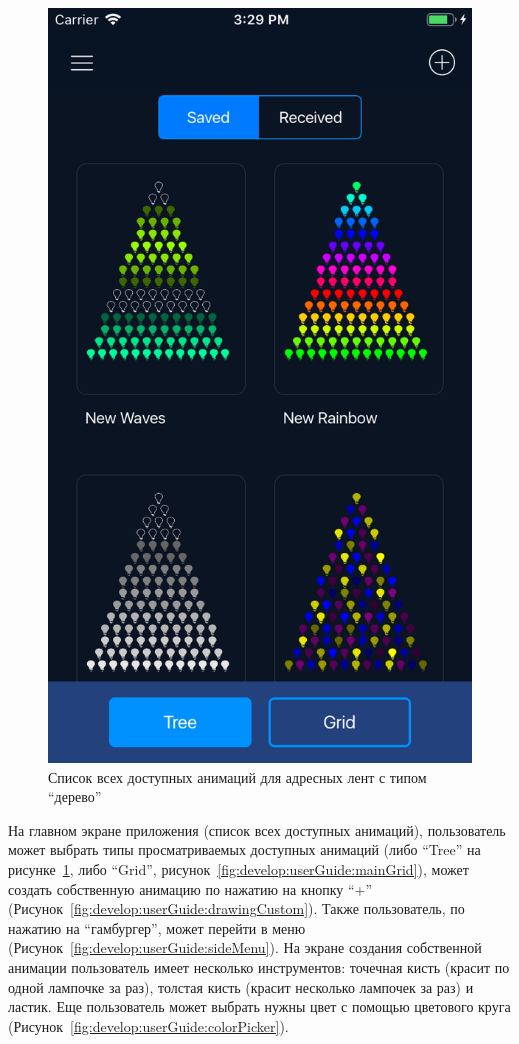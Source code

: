 \begin{figure}[H]
\centering
	\includegraphics[scale=0.2]{figures/userGuide/mainTree.png}
	\caption{Список всех доступных анимаций для адресных лент с типом \enquote{дерево}}
	\label{fig:develop:userGuide:mainTree}
\end{figure}

На главном экране приложения (список всех доступных анимаций), пользователь может выбрать типы просматриваемых доступных анимаций (либо \enquote{Tree} на рисунке~\ref{fig:develop:userGuide:mainTree}, либо \enquote{Grid}, рисунок~\ref{fig:develop:userGuide:mainGrid}), может создать собственную анимацию по нажатию на кнопку \enquote{+} (Рисунок~\ref{fig:develop:userGuide:drawingCustom}). Также пользователь, по нажатию на \enquote{гамбургер}, может перейти в меню (Рисунок~\ref{fig:develop:userGuide:sideMenu}). На экране создания собственной анимации пользователь имеет несколько инструментов: точечная кисть (красит по одной лампочке за раз), толстая кисть (красит несколько лампочек за раз) и ластик. Еще пользователь может выбрать нужны цвет с помощью цветового круга (Рисунок~\ref{fig:develop:userGuide:colorPicker}).

